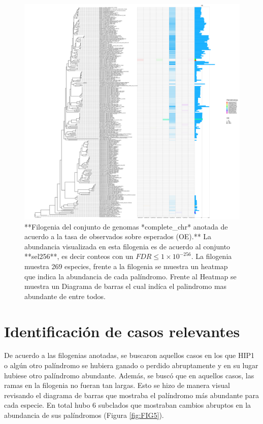 \documentclass[
]{book}
\begin{document}
\begin{figure}

{\centering \includegraphics[width=75in]{figures/refseq_chr_269_Octanuc_OE_sel256_filogenia_HIG} 

}

\caption{**Filogenia del conjunto de genomas *complete\_chr* anotada de acuerdo a la tasa de observados sobre esperados (OE).** La abundancia visualizada en esta filogenia es de acuerdo al conjunto **sel256**, es decir conteos con un $FDR \leq 1 \times 10^{-256}$. La filogenia muestra 269 especies, frente a la filogenia se muestra un heatmap que indica la abundancia de cada palíndromo. Frente al Heatmap se muestra un Diagrama de barras el cual indíca el palindromo mas abundante de entre todos.}\label{fig:FIG4}
\end{figure}

\hypertarget{identificaciuxf3n-de-casos-relevantes}{%
\section{Identificación de casos relevantes}\label{identificaciuxf3n-de-casos-relevantes}}

De acuerdo a las filogenias anotadas, se buscaron aquellos casos en los que HIP1 o algún otro palíndromo se hubiera ganado o perdido abruptamente y en su lugar hubiese otro palíndromo abundante. Además, se buscó que en aquellos casos, las ramas en la filogenia no fueran tan largas. Esto se hizo de manera visual revisando el diagrama de barras que mostraba el palíndromo más abundante para cada especie. En total hubo 6 subclados que mostraban cambios abruptos en la abundancia de sus palíndromos (Figura \ref{fig:FIG5}).
\end{document}
